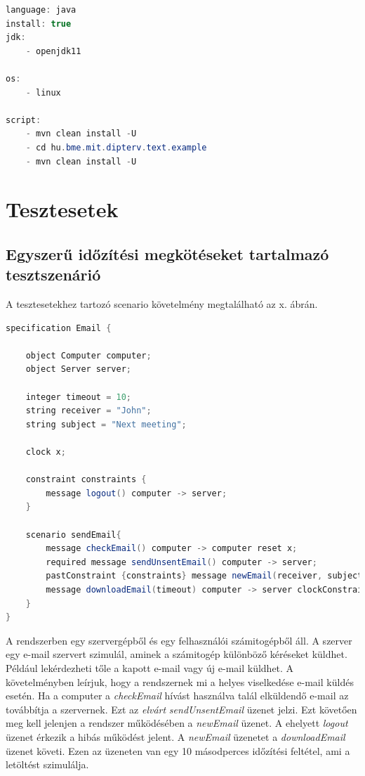 \begin{lstlisting}[language=java, frame=single, float=ht!, caption={Travis CI-hoz tartozó .travis.yml script.},captionpos=b]
language: java
install: true
jdk:
    - openjdk11

os:
    - linux

script:
    - mvn clean install -U
    - cd hu.bme.mit.dipterv.text.example
    - mvn clean install -U
\end{lstlisting}

\clearpage\section{Tesztesetek}

\subsection{Egyszerű időzítési megkötéseket tartalmazó tesztszenárió}

A tesztesetekhez tartozó scenario követelmény megtalálható az x. ábrán.

\begin{lstlisting}[language=java, frame=single, float=ht!, caption={Integrációs teszteset.},captionpos=b]
specification Email {

	object Computer computer;
	object Server server;

	integer timeout = 10;
	string receiver = "John";
	string subject = "Next meeting";

	clock x;

	constraint constraints {
		message logout() computer -> server;
	}

	scenario sendEmail{
		message checkEmail() computer -> computer reset x;
		required message sendUnsentEmail() computer -> server;
		pastConstraint {constraints} message newEmail(receiver, subject) computer -> server;
		message downloadEmail(timeout) computer -> server clockConstraint {>(x,10)};
	}
}
\end{lstlisting}

A rendszerben egy szervergépből és egy felhasználói számitogépből áll.
A szerver egy e-mail szervert szimulál, aminek a számitogép különböző kéréseket küldhet.
Például lekérdezheti tőle a kapott e-mail vagy új e-mail küldhet.
A követelményben leírjuk, hogy a rendszernek mi a helyes viselkedése e-mail küldés esetén.
Ha a computer a \textit{checkEmail} hívást használva talál elküldendő e-mail az továbbítja a szervernek.
Ezt az \textit{elvárt} \textit{sendUnsentEmail} üzenet jelzi.
Ezt követően meg kell jelenjen a rendszer működésében a \textit{newEmail} üzenet.
A ehelyett \textit{logout} üzenet érkezik a hibás működést jelent.
A \textit{newEmail} üzenetet a \textit{downloadEmail} üzenet követi.
Ezen az üzeneten van egy 10 másodperces időzítési feltétel, ami a letöltést szimulálja.

